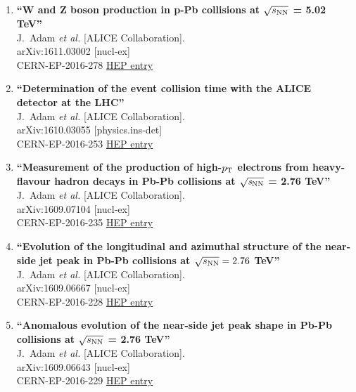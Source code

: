 \begin{enumerate}
\item%
{\bf ``W and Z boson production in p-Pb collisions at $\sqrt{s_{\rm NN}}$ = 5.02 TeV''}
  \\{}J.~Adam {\it et al.} [ALICE Collaboration].
  \\{}arXiv:1611.03002 [nucl-ex]
  \\{}CERN-EP-2016-278
\href{http://inspirehep.net/record/1496634}{HEP entry}

\item%
{\bf ``Determination of the event collision time with the ALICE detector at the LHC''}
  \\{}J.~Adam {\it et al.} [ALICE Collaboration].
  \\{}arXiv:1610.03055 [physics.ins-det]
  \\{}CERN-EP-2016-253
\href{http://inspirehep.net/record/1491202}{HEP entry}

\item%
{\bf ``Measurement of the production of high-$p_{\rm T}$ electrons from heavy-flavour hadron decays in Pb-Pb collisions at $\mathbf{\sqrt{\it s_{\rm{NN}}}}$ = 2.76 TeV''}
  \\{}J.~Adam {\it et al.} [ALICE Collaboration].
  \\{}arXiv:1609.07104 [nucl-ex]
  \\{}CERN-EP-2016-235
\href{http://inspirehep.net/record/1487727}{HEP entry}

\item%
{\bf ``Evolution of the longitudinal and azimuthal structure of the near-side jet peak in Pb-Pb collisions at $\sqrt{s_{\rm NN}} = 2.76$ TeV''}
  \\{}J.~Adam {\it et al.} [ALICE Collaboration].
  \\{}arXiv:1609.06667 [nucl-ex]
  \\{}CERN-EP-2016-228
\href{http://inspirehep.net/record/1487546}{HEP entry}

\item%
{\bf ``Anomalous evolution of the near-side jet peak shape in Pb-Pb collisions at $\sqrt{s_{\rm NN}}$ = 2.76 TeV''}
  \\{}J.~Adam {\it et al.} [ALICE Collaboration].
  \\{}arXiv:1609.06643 [nucl-ex]
  \\{}CERN-EP-2016-229
\href{http://inspirehep.net/record/1487545}{HEP entry}


\end{enumerate}
